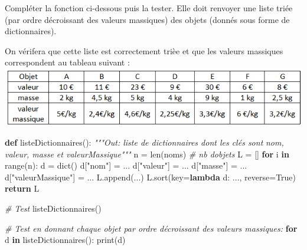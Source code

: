 \documentclass[
  paper=a4,
  ,captions=tableheading
]{scrartcl}
\newenvironment{Shaded}{}{}
\newcommand{\BuiltInTok}[1]{\textcolor[rgb]{0.00,0.50,0.00}{#1}}
\newcommand{\CommentTok}[1]{\textcolor[rgb]{0.38,0.63,0.69}{\textit{#1}}}
\newcommand{\ControlFlowTok}[1]{\textcolor[rgb]{0.00,0.44,0.13}{\textbf{#1}}}
\newcommand{\KeywordTok}[1]{\textcolor[rgb]{0.00,0.44,0.13}{\textbf{#1}}}
\newcommand{\NormalTok}[1]{#1}
\newcommand{\OperatorTok}[1]{\textcolor[rgb]{0.40,0.40,0.40}{#1}}
\newcommand{\StringTok}[1]{\textcolor[rgb]{0.25,0.44,0.63}{#1}}
\newcommand{\VariableTok}[1]{\textcolor[rgb]{0.10,0.09,0.49}{#1}}
\begin{document}
Compléter la fonction ci-dessous puis la tester. Elle doit renvoyer une
liste triée (par ordre décroissant des valeurs massiques) des objets
(donnés sous forme de dictionnaires).

On vérifera que cette liste est correctement trièe et que les valeurs
massiques correspondent au tableau suivant :\\
\includegraphics{images/3-image.png}

\begin{Shaded}
\begin{Highlighting}[]
\KeywordTok{def}\NormalTok{ listeDictionnaires():}
    \CommentTok{"""Out: liste de dictionnaires dont les clés sont}
\CommentTok{    nom, valeur, masse et valeurMassique"""}
\NormalTok{    n }\OperatorTok{=} \BuiltInTok{len}\NormalTok{(noms)  }\CommentTok{\# nb d\textquotesingle{}objets}
\NormalTok{    L }\OperatorTok{=}\NormalTok{ []}
    \ControlFlowTok{for}\NormalTok{ i }\KeywordTok{in} \BuiltInTok{range}\NormalTok{(n):}
\NormalTok{        d }\OperatorTok{=} \BuiltInTok{dict}\NormalTok{()}
\NormalTok{        d[}\StringTok{"nom"}\NormalTok{] }\OperatorTok{=}\NormalTok{ ...}
\NormalTok{        d[}\StringTok{"valeur"}\NormalTok{] }\OperatorTok{=}\NormalTok{ ...}
\NormalTok{        d[}\StringTok{"masse"}\NormalTok{] }\OperatorTok{=}\NormalTok{ ...}
\NormalTok{        d[}\StringTok{"valeurMassique"}\NormalTok{] }\OperatorTok{=}\NormalTok{ ...}
\NormalTok{        L.append(...)}
\NormalTok{    L.sort(key}\OperatorTok{=}\KeywordTok{lambda}\NormalTok{ d: ..., reverse}\OperatorTok{=}\VariableTok{True}\NormalTok{)}
    \ControlFlowTok{return}\NormalTok{ L}
\end{Highlighting}
\end{Shaded}

\begin{Shaded}
\begin{Highlighting}[]
\CommentTok{\# Test}
\NormalTok{listeDictionnaires()}
\end{Highlighting}
\end{Shaded}

\begin{Shaded}
\begin{Highlighting}[]
\CommentTok{\# Test en donnant chaque objet par ordre décroissant des valeurs massiques:}
\ControlFlowTok{for}\NormalTok{ d }\KeywordTok{in}\NormalTok{ listeDictionnaires():}
    \BuiltInTok{print}\NormalTok{(d)}
\end{Highlighting}
\end{Shaded}
\end{document}
